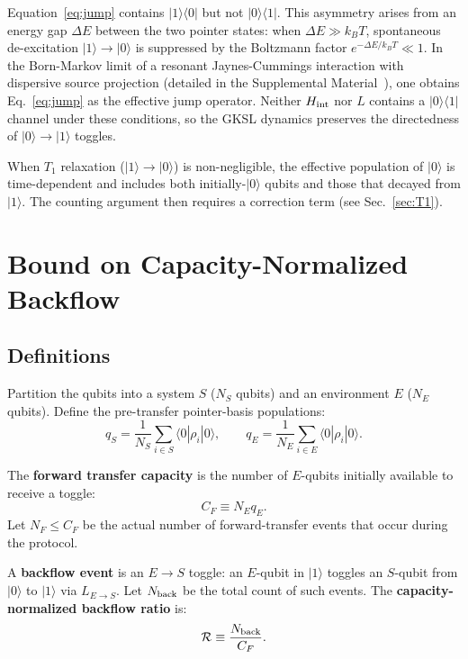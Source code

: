 \documentclass[aps,pra,twocolumn,superscriptaddress,floatfix]{revtex4-2}
\begin{document}
Equation~\eqref{eq:jump} contains $|1\rangle\langle 0|$ but not $|0\rangle\langle 1|$. This asymmetry arises from an energy gap $\Delta E$ between the two pointer states: when $\Delta E \gg k_B T$, spontaneous de-excitation $|1\rangle \to |0\rangle$ is suppressed by the Boltzmann factor $e^{-\Delta E/k_B T} \ll 1$. In the Born-Markov limit of a resonant Jaynes-Cummings interaction with dispersive source projection (detailed in the Supplemental Material~\cite{SM}), one obtains Eq.~\eqref{eq:jump} as the effective jump operator. Neither $H_{\rm int}$ nor $L$ contains a $|0\rangle\langle 1|$ channel under these conditions, so the GKSL dynamics preserves the directedness of $|0\rangle \to |1\rangle$ toggles.

When $T_1$ relaxation ($|1\rangle \to |0\rangle$) is non-negligible, the effective population of $|0\rangle$ is time-dependent and includes both initially-$|0\rangle$ qubits and those that decayed from $|1\rangle$. The counting argument then requires a correction term (see Sec.~\ref{sec:T1}).

\section{Bound on Capacity-Normalized Backflow}
\label{sec:theorem}

\subsection{Definitions}

Partition the qubits into a system $S$ ($N_S$ qubits) and an environment $E$ ($N_E$ qubits). Define the pre-transfer pointer-basis populations:
\begin{equation}
q_S = \frac{1}{N_S}\sum_{i\in S} \langle 0|\rho_i|0\rangle, \qquad
q_E = \frac{1}{N_E}\sum_{i\in E} \langle 0|\rho_i|0\rangle.
\end{equation}

The \textbf{forward transfer capacity} is the number of $E$-qubits initially available to receive a toggle:
\begin{equation}
C_F \equiv N_E q_E.
\end{equation}
Let $N_F \leq C_F$ be the actual number of forward-transfer events that occur during the protocol.

A \textbf{backflow event} is an $E \to S$ toggle: an $E$-qubit in $|1\rangle$ toggles an $S$-qubit from $|0\rangle$ to $|1\rangle$ via $L_{E\to S}$. Let $N_{\rm back}$ be the total count of such events. The \textbf{capacity-normalized backflow ratio} is:
\begin{equation}
\mathcal{R} \equiv \frac{N_{\rm back}}{C_F}.
\end{equation}
\end{document}
